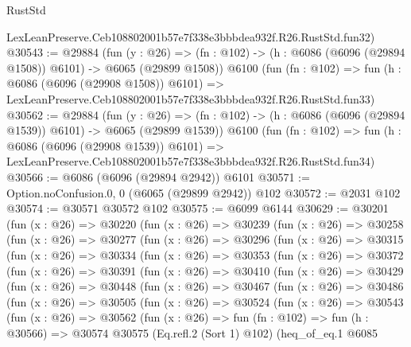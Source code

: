\begin{lexlean}{RustStd}
\begin{coremodule}
    LexLeanPreserve.Ceb108802001b57e7f338e3bbbdea932f.R26.RustStd.fun32)
@30543 := @29884
    (fun (y : @26) =>
    (fn : @102) -> (h : @6086 (@6096 (@29894 @1508)) @6101) -> @6065 (@29899 @1508))
    @6100
    (fun (fn : @102) =>
    fun (h : @6086 (@6096 (@29908 @1508)) @6101) =>
    LexLeanPreserve.Ceb108802001b57e7f338e3bbbdea932f.R26.RustStd.fun33)
@30562 := @29884
    (fun (y : @26) =>
    (fn : @102) -> (h : @6086 (@6096 (@29894 @1539)) @6101) -> @6065 (@29899 @1539))
    @6100
    (fun (fn : @102) =>
    fun (h : @6086 (@6096 (@29908 @1539)) @6101) =>
    LexLeanPreserve.Ceb108802001b57e7f338e3bbbdea932f.R26.RustStd.fun34)
@30566 := @6086 (@6096 (@29894 @2942)) @6101
@30571 := Option.noConfusion.{0, 0} (@6065 (@29899 @2942)) @102
@30572 := @2031 @102
@30574 := @30571 @30572 @102
@30575 := @6099 @6144
@30629 := @30201
    (fun (x : @26) =>
    @30220
      (fun (x : @26) =>
      @30239
        (fun (x : @26) =>
        @30258
          (fun (x : @26) =>
          @30277
            (fun (x : @26) =>
            @30296
              (fun (x : @26) =>
              @30315
                (fun (x : @26) =>
                @30334
                  (fun (x : @26) =>
                  @30353
                    (fun (x : @26) =>
                    @30372
                      (fun (x : @26) =>
                      @30391
                        (fun (x : @26) =>
                        @30410
                          (fun (x : @26) =>
                          @30429
                            (fun (x : @26) =>
                            @30448
                              (fun (x : @26) =>
                              @30467
                                (fun (x : @26) =>
                                @30486
                                  (fun (x : @26) =>
                                  @30505
                                    (fun (x : @26) =>
                                    @30524
                                      (fun (x : @26) =>
                                      @30543
                                        (fun (x : @26) =>
                                        @30562
                                          (fun (x : @26) =>
                                          fun (fn : @102) =>
                                          fun (h : @30566) =>
                                          @30574
                                            @30575
                                            (Eq.refl.{2} (Sort 1) @102)
                                            (heq_of_eq.{1}
                                              @6085

\end{coremodule}
\end{lexlean}
